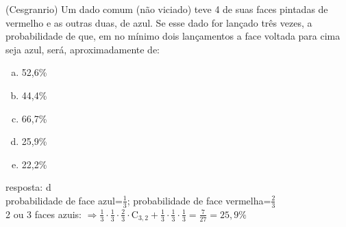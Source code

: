 \begin{ex}
 (Cesgranrio) Um dado comum (não viciado) teve 4 de suas faces pintadas de vermelho e as outras duas, de azul. Se esse dado for lançado três vezes, a probabilidade de que, em no mínimo dois lançamentos a face voltada para cima seja azul, será, aproximadamente de:
    \begin{enumerate}[(a)]
    \item 52,6\%
    \item 44,4\%
    \item 66,7\%
    \item 25,9\%
    \item 22,2\%
    \end{enumerate}
     \begin{sol}
     resposta: d  \\
     probabilidade de face azul=$\frac{1}{3}$; probabilidade de face vermelha=$\frac{2}{3}$\\
     2 ou 3 faces azuis: $\Longrightarrow\frac{1}{3}\cdot\frac{1}{3}\cdot\frac{2}{3}\cdot\mathrm{C}_{3,2}+\frac{1}{3}\cdot\frac{1}{3}\cdot\frac{1}{3}= \frac{7}{27}=25,9\%$
     \end{sol}
\end{ex}